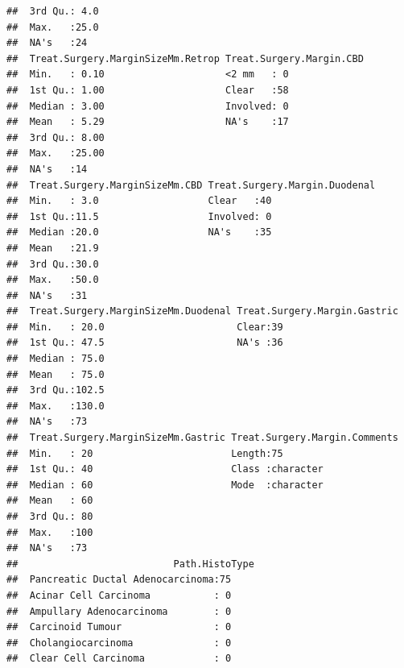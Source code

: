 \documentclass{article}\usepackage[]{graphicx}\usepackage[]{color}
\makeatletter
\newenvironment{kframe}{%
 \def\at@end@of@kframe{}%
 \ifinner\ifhmode%
  \def\at@end@of@kframe{\end{minipage}}%
  \begin{minipage}{\columnwidth}%
 \fi\fi%
 \def\FrameCommand##1{\hskip\@totalleftmargin \hskip-\fboxsep
 \colorbox{shadecolor}{##1}\hskip-\fboxsep
     \hskip-\linewidth \hskip-\@totalleftmargin \hskip\columnwidth}%
 \MakeFramed {\advance\hsize-\width
   \@totalleftmargin\z@ \linewidth\hsize
   \@setminipage}}%
 {\par\unskip\endMakeFramed%
 \at@end@of@kframe}
\newenvironment{knitrout}{}{} %
\makeatother
\begin{document}
\begin{knitrout}
\begin{kframe}
\begin{verbatim}
##  3rd Qu.: 4.0                                                   
##  Max.   :25.0                                                   
##  NA's   :24                                                     
##  Treat.Surgery.MarginSizeMm.Retrop Treat.Surgery.Margin.CBD
##  Min.   : 0.10                     <2 mm   : 0             
##  1st Qu.: 1.00                     Clear   :58             
##  Median : 3.00                     Involved: 0             
##  Mean   : 5.29                     NA's    :17             
##  3rd Qu.: 8.00                                             
##  Max.   :25.00                                             
##  NA's   :14                                                
##  Treat.Surgery.MarginSizeMm.CBD Treat.Surgery.Margin.Duodenal
##  Min.   : 3.0                   Clear   :40                  
##  1st Qu.:11.5                   Involved: 0                  
##  Median :20.0                   NA's    :35                  
##  Mean   :21.9                                                
##  3rd Qu.:30.0                                                
##  Max.   :50.0                                                
##  NA's   :31                                                  
##  Treat.Surgery.MarginSizeMm.Duodenal Treat.Surgery.Margin.Gastric
##  Min.   : 20.0                       Clear:39                    
##  1st Qu.: 47.5                       NA's :36                    
##  Median : 75.0                                                   
##  Mean   : 75.0                                                   
##  3rd Qu.:102.5                                                   
##  Max.   :130.0                                                   
##  NA's   :73                                                      
##  Treat.Surgery.MarginSizeMm.Gastric Treat.Surgery.Margin.Comments
##  Min.   : 20                        Length:75                    
##  1st Qu.: 40                        Class :character             
##  Median : 60                        Mode  :character             
##  Mean   : 60                                                     
##  3rd Qu.: 80                                                     
##  Max.   :100                                                     
##  NA's   :73                                                      
##                           Path.HistoType
##  Pancreatic Ductal Adenocarcinoma:75    
##  Acinar Cell Carcinoma           : 0    
##  Ampullary Adenocarcinoma        : 0    
##  Carcinoid Tumour                : 0    
##  Cholangiocarcinoma              : 0    
##  Clear Cell Carcinoma            : 0    

\end{verbatim}
\end{kframe}
\end{knitrout}
\end{document}
